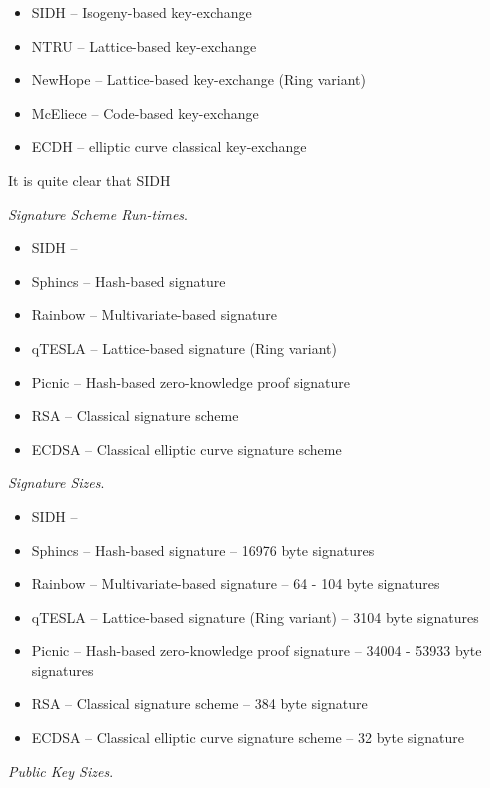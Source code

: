 \begin{itemize}
\item SIDH -- Isogeny-based key-exchange
\item NTRU -- Lattice-based key-exchange
\item NewHope -- Lattice-based key-exchange (Ring variant)
\item McEliece -- Code-based key-exchange
\item ECDH -- elliptic curve classical key-exchange
\end{itemize}

It is quite clear that SIDH 

\noindent
\textit{Signature Scheme Run-times}.

\begin{itemize}
\item SIDH --
\item Sphincs -- Hash-based signature
\item Rainbow -- Multivariate-based signature
\item qTESLA -- Lattice-based signature (Ring variant)
\item Picnic -- Hash-based zero-knowledge proof signature
\item RSA -- Classical signature scheme
\item ECDSA -- Classical elliptic curve signature scheme
\end{itemize}

\noindent
\textit{Signature Sizes}.

\begin{itemize}
\item SIDH --
\item Sphincs -- Hash-based signature -- 16976 byte signatures
\item Rainbow -- Multivariate-based signature -- 64 - 104 byte signatures
\item qTESLA -- Lattice-based signature (Ring variant) -- 3104 byte signatures
\item Picnic -- Hash-based zero-knowledge proof signature -- 34004 - 53933 byte signatures
\item RSA -- Classical signature scheme -- 384 byte signature
\item ECDSA -- Classical elliptic curve signature scheme -- 32 byte signature
\end{itemize}

\noindent
\textit{Public Key Sizes}.

